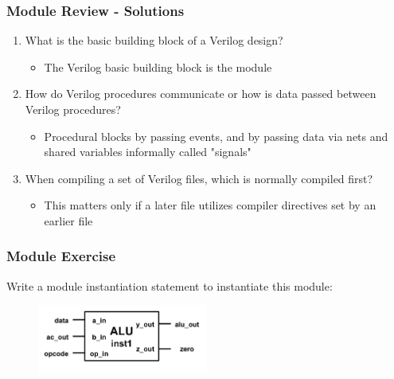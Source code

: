 \documentclass[t, notes]{beamer}
\begin{document}
\begin{frame}
\frametitle{Module Review - Solutions}

\begin{enumerate}
\item What is the basic building block of a Verilog design?
\begin{itemize}
	\item The Verilog basic building block is the module
\end{itemize}
\item How do Verilog procedures communicate or how is data passed between Verilog procedures?
\begin{itemize}
	\item Procedural blocks  by passing events, and by passing data via nets and shared variables informally called "signals" 
\end{itemize}
\item When compiling a set of Verilog files, which is normally compiled first?
\begin{itemize}
	\item This matters only if a later file utilizes compiler directives set by an earlier file
\end{itemize}
\end{enumerate}
\end{frame}

\begin{frame}
\frametitle{Module Exercise}

Write a module instantiation statement to instantiate this module:
\begin{figure}[H!]
    \includegraphics[width=0.5\textwidth]{img/03_module.png}
\end{figure}

\end{frame}
\end{document}

